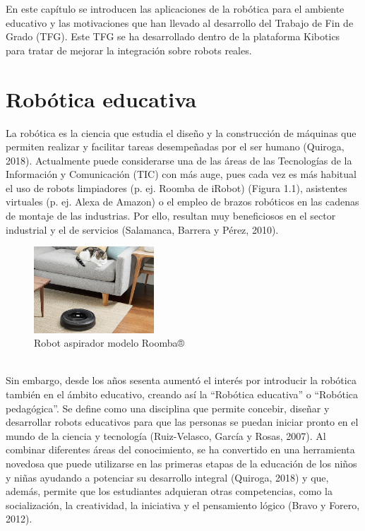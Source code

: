\documentclass{report}
\begin{document}
En este capítulo se introducen las aplicaciones de la robótica para el ambiente educativo y las motivaciones que han llevado al desarrollo del Trabajo de Fin de Grado (TFG). Este TFG se ha desarrollado dentro de la plataforma Kibotics para tratar de mejorar la integración sobre robots reales.

\section{Robótica educativa}

La robótica es la ciencia que estudia el diseño y la construcción de máquinas que permiten realizar y facilitar tareas desempeñadas por el ser humano (Quiroga, 2018). Actualmente puede considerarse una de las áreas de las Tecnologías de la Información y Comunicación (TIC) con más auge, pues cada vez es más habitual el uso de robots limpiadores (p. ej. Roomba de iRobot) (Figura 1.1), asistentes virtuales (p. ej. Alexa de Amazon) o el empleo de brazos robóticos en las cadenas de montaje de las industrias. Por ello, resultan muy beneficiosos en el sector industrial y el de servicios (Salamanca, Barrera y Pérez, 2010).
\\
\begin{figure}
  \centering
    \includegraphics[width=0.4\textwidth]{images/romba.png}
  \caption{Robot aspirador modelo Roomba®}
  \label{Roomba}
\end{figure}
\\

Sin embargo, desde los años sesenta aumentó el interés por introducir la robótica también en el ámbito educativo, creando así la “Robótica educativa” o “Robótica pedagógica”. Se define como una disciplina que permite concebir, diseñar y desarrollar robots educativos para que las personas se puedan iniciar pronto en el mundo de la ciencia y tecnología (Ruiz-Velasco, García y Rosas, 2007). Al combinar diferentes áreas del conocimiento, se ha convertido en una herramienta novedosa que puede utilizarse en las primeras etapas de la educación de los niños y niñas ayudando a potenciar su desarrollo integral (Quiroga, 2018) y que, además, permite que los estudiantes adquieran otras competencias, como la socialización, la creatividad,  la iniciativa y el pensamiento lógico (Bravo y Forero, 2012).
\\
\end{document}
